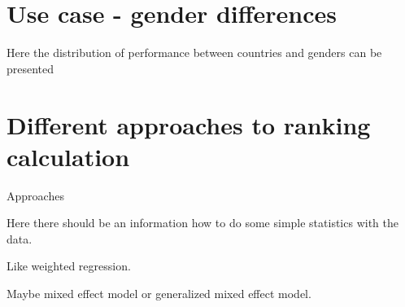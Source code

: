 \section{Use case - gender differences}

Here the distribution of performance between countries and genders can be presented



\section{Different approaches to ranking calculation}

Approaches








Here there should be an information how to do some simple statistics with the data.

Like weighted regression.

Maybe mixed effect model or generalized mixed effect model.

